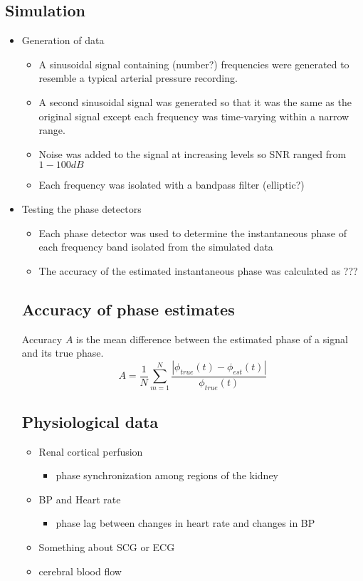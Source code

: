 \documentclass{article}
\begin{document}
\subsection*{Simulation}
\begin{itemize}
\item Generation of data
	\begin{itemize}
	\item A sinusoidal signal containing (number?) frequencies were generated to resemble a typical arterial pressure recording. 
	\item A second sinusoidal signal was generated so that it was the same as the original signal except each frequency was time-varying within a narrow range.
	\item Noise was added to the signal at increasing levels so SNR ranged from $1-100 dB$
	\item Each frequency was isolated with a bandpass filter (elliptic?)
	\end{itemize}
\item Testing the phase detectors
	\begin{itemize}
	\item Each phase detector was used to determine the instantaneous phase of each frequency band isolated from the simulated data
	\item The accuracy of the estimated instantaneous phase was calculated as ???
	\end{itemize}
	
\subsection*{Accuracy of phase estimates}
Accuracy $A$ is the mean difference between the estimated phase of a signal and its true phase. 
$$ A = \frac{1}{N} \sum_{m=1}^{N} \frac{\left| \phi _{true} (t) - \phi _{est} (t) \right|}{\phi _{true} (t)} $$

\subsection*{Physiological data}
\begin{itemize}
\item Renal cortical perfusion
	\begin{itemize}
	\item phase synchronization among regions of the kidney
	\end{itemize}
\item BP and Heart rate
	\begin{itemize}
	\item phase lag between changes in heart rate and changes in BP
	\end{itemize}
\item Something about SCG or ECG
\item cerebral blood flow
\end{itemize}

\end{itemize}
\end{document}
